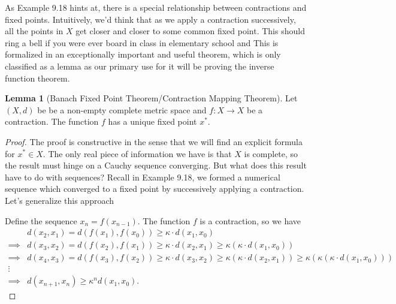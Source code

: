 \documentclass{article}
\theoremstyle{definition}
\newtheorem{lemma}{Lemma}[section]
\begin{document}
	As Example 9.18 hints at, there is a special relationship between contractions and fixed points. Intuitively, we'd think that as we apply a contraction successively, all the points in $ X $ get closer and closer to some common fixed point. This should ring a bell if you were ever board in class in elementary school and This is formalized in an exceptionally important and useful theorem, which is only classified as a lemma as our primary use for it will be proving the inverse function theorem. 
	\begin{lemma}[Banach Fixed Point Theorem/Contraction Mapping Theorem]
		Let $ (X,d) $ be be a non-empty complete metric space and $ f:X\to X $ be a contraction. The function $ f $ has a unique fixed point $ x^*  $. 
	\end{lemma} 
	\begin{proof}
		The proof is constructive in the sense that we will find an explicit formula for $ x^*\in X $. The only real piece of information we have is that $ X $ is complete, so the result must hinge on a Cauchy sequence converging. But what does this result have to do with sequences? Recall in Example 9.18, we formed a numerical sequence which converged to a fixed point by successively applying a contraction. Let's generalize this approach
		
		Define the sequence $  x_n = f(x_{n-1}) $. The function $ f $ is a contraction, so we have 
		\begin{align}
			&  d(x_2, x_1) = d(f(x_1), f(x_0))	\ge \kappa\cdot d(x_1, x_0)\nonumber	\\ \implies &
			d(x_3, x_2) = d(f(x_2), f(x_1))	\ge \kappa\cdot d(x_2, x_1)	\ge \kappa (\kappa\cdot d(x_1, x_0)	)\nonumber\\
			\implies &
			d(x_4, x_3) = d(f(x_3), f(x_2))	\ge \kappa\cdot d(x_3, x_2)	\ge \kappa (\kappa\cdot d(x_2, x_1)	) \ge \kappa(\kappa(\kappa\cdot d(x_1, x_0)))\nonumber\\ \vdots \nonumber\\ \implies &  d(x_{n+1}, x_n) \ge \kappa^nd(x_1,x_0).
		\end{align}
		

\end{proof}
\end{document}
